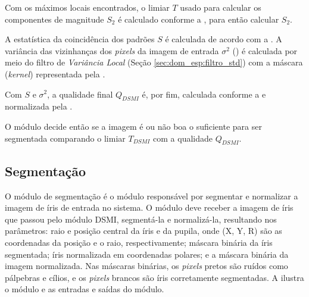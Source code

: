 \par Com os máximos locais encontrados, o limiar $T$ usado para calcular os componentes de magnitude $S_{2}$ é calculado conforme a , para então calcular $S_{2}$. 

\par A estatística da coincidência dos padrões $S$ é calculada de acordo com a . A variância das vizinhanças dos \textit{pixels} da imagem de entrada $\sigma^2$ () é calculada por meio do filtro de \textit{Variância Local} (Seção \ref{sec:dom_esp:filtro_std}) com a máscara (\textit{kernel}) representada pela .

\par Com $S$ e $\sigma^2$, a qualidade final $Q_{DSMI}$ é, por fim, calculada conforme a  e normalizada pela .

\par O módulo decide então se a imagem é ou não boa o suficiente para ser segmentada comparando o limiar $T_{DSMI}$ com a qualidade $Q_{DSMI}$.


\subsection{Segmentação}\label{sec:metodologia:segmentacao}

\par O módulo de segmentação é o módulo responsável por segmentar e normalizar a imagem de íris de entrada no sistema. O módulo deve receber a imagem de íris que passou pelo módulo \acrshort{DSMI}, segmentá-la e normalizá-la, resultando nos parâmetros: raio e posição central da íris e da pupila, onde (X, Y, R) são as coordenadas da posição e o raio, respectivamente; máscara binária da íris segmentada; íris normalizada em coordenadas polares; e a máscara binária da imagem normalizada. Nas máscaras binárias, os \textit{pixels} pretos são ruídos como pálpebras e cílios, e os \textit{pixels} brancos são íris corretamente segmentadas. A  ilustra o módulo e as entradas e saídas do módulo.

